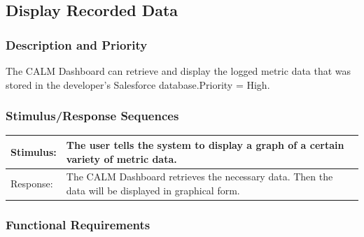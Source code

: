 \documentclass[12pt,oneside,letterpaper]{article}
\begin{document}
\subsection{Display Recorded Data}
\subsubsection{Description and Priority}
The CALM Dashboard can retrieve and display the logged metric data that was stored in 
the developer's Salesforce database.\newline Priority = High.
\subsubsection{Stimulus/Response Sequences}

\begin{longtable}{|l|p{3.8in}|}
\hline
Stimulus:&The user tells the system to display a graph of a certain 
variety of metric data.\\
\hline
Response:&The CALM Dashboard retrieves the necessary data. Then the data will be displayed in graphical form.\\
\hline
\end{longtable}
 
\subsubsection{Functional Requirements}
\end{document}

